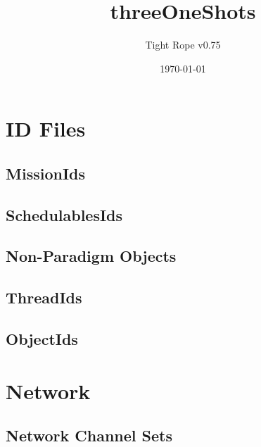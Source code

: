 \documentclass[10pt,a4paper]{article}
\title{threeOneShots}
\author{Tight Rope v0.75}
\date{\today}
\begin{document}
\maketitle

\section{ID Files}
\subsection{MissionIds}

\newpage

\subsection{SchedulablesIds}

\newpage

\subsection{Non-Paradigm Objects}
\newpage

\subsection{ThreadIds}

\newpage

\subsection{ObjectIds}

\newpage

\section{Network}
\subsection{Network Channel Sets}




{}
\end{document}
